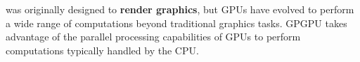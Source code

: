 \highspace
{} was originally designed to \textbf{render graphics}, but GPUs have evolved to perform a wide range of computations beyond traditional graphics tasks. GPGPU takes advantage of the parallel processing capabilities of GPUs to perform computations typically handled by the CPU.